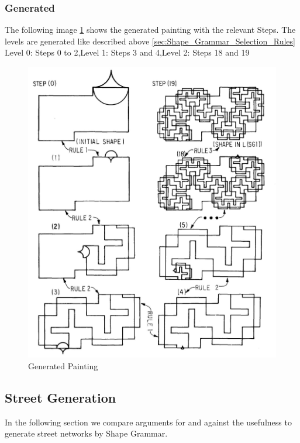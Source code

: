 \documentclass[11pt, a4paper]{report}
\begin{document}
\subsubsection{Generated}
The following image \ref{fig:Shape Grammars/Example} shows the generated painting with the relevant Steps. The levels are generated like described above \ref{sec:Shape_Grammar_Selection_Rules} 
\newline
Level 0: Steps 0 to 2,\newline Level 1: Steps 3 and 4,\newline Level 2: Steps 18 and 19
\begin{figure}[!h]
    \centering
    \includegraphics{sg_example.jpg}
    \caption{ Generated Painting\citep{shapeGrammars:1972}}\label{fig:Shape Grammars/Example}
\end{figure}

\pagebreak
\subsection{Street Generation}
In the following section we compare arguments for and against the usefulness to generate street networks by Shape Grammar. 
\end{document}
